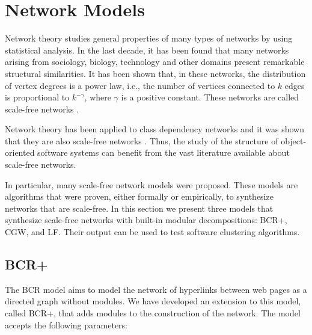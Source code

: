 \section{Network Models} \label{sec:models} 

Network theory studies general properties of many types of networks by using
statistical analysis. In the last decade, it has been found that many networks
arising from sociology, biology, technology and other domains present remarkable
structural similarities. It has been shown that, in these networks, the
distribution of vertex degrees is a power law, i.e., the number of vertices
connected to $k$ edges is proportional to $k^{-\gamma}$, where $\gamma$ is a
positive constant. These networks are called scale-free networks
\cite{Barabasi1999}.

Network theory has been applied to class dependency networks and it was shown
that they are also scale-free networks \cite{Myers2003,Valverde2002}. Thus, the
study of the structure of object-oriented software systems can benefit from the
vast literature available about scale-free networks.

In particular, many scale-free network models were proposed. These models are
algorithms that were proven, either formally or empirically, to synthesize
networks that are scale-free. In this section we present three models that
synthesize scale-free networks with built-in modular decompositions: BCR+, CGW,
and LF. Their output can be used to test software clustering algorithms.



\subsection{BCR+}

The BCR model \cite{Bollobas2003} aims to model the network of hyperlinks
between web pages as a directed graph without modules. We have developed an
extension to this model, called BCR+, that adds modules to the construction of
the network. The model accepts the following parameters:

